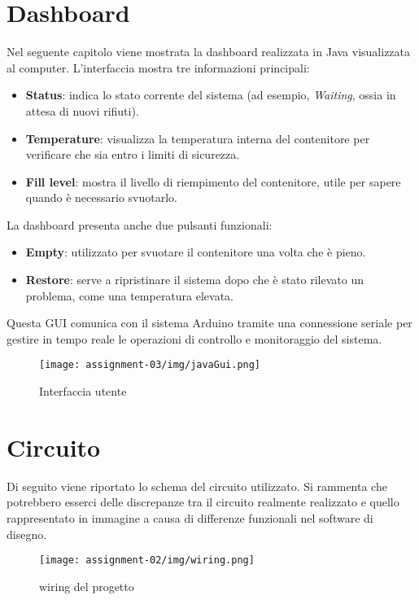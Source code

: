 \documentclass{report}
\begin{document}
\chapter{Dashboard}
Nel seguente capitolo viene mostrata la dashboard realizzata in Java visualizzata al computer. L'interfaccia mostra tre informazioni principali:
\begin{itemize}
    \item \textbf{Status}: indica lo stato corrente del sistema (ad esempio, \textit{Waiting}, ossia in attesa di nuovi rifiuti).
    \item \textbf{Temperature}: visualizza la temperatura interna del contenitore per verificare che sia entro i limiti di sicurezza.
    \item \textbf{Fill level}: mostra il livello di riempimento del contenitore, utile per sapere quando è necessario svuotarlo.
\end{itemize}
La dashboard presenta anche due pulsanti funzionali:
\begin{itemize}
    \item \textbf{Empty}: utilizzato per svuotare il contenitore una volta che è pieno.
    \item \textbf{Restore}: serve a ripristinare il sistema dopo che è stato rilevato un problema, come una temperatura elevata.
\end{itemize}
Questa GUI comunica con il sistema Arduino tramite una connessione seriale per gestire in tempo reale le operazioni di controllo e monitoraggio del sistema.
\begin{figure}[H]
    \centering
    \texttt{[image: assignment-03/img/javaGui.png]}
    \caption{Interfaccia utente}
    \label{fig:GUI}
\end{figure}


\chapter{Circuito}
Di seguito viene riportato lo schema del circuito utilizzato. Si rammenta che potrebbero esserci delle discrepanze tra il circuito realmente realizzato e quello rappresentato in immagine a causa di differenze funzionali nel software di disegno.
\begin{figure}[H]
    \centering
    \texttt{[image: assignment-02/img/wiring.png]}
    \caption{wiring del progetto}
    \label{fig:wiring}
\end{figure}
\end{document}
